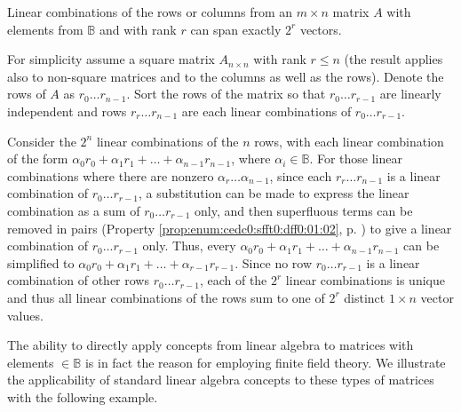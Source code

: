 \begin{vworklemmastatement}
\label{lem:cedc0:sfft0:rmc0:01}
Linear combinations of the
rows or columns from an
$m \times n$ matrix $A$ with elements from $\mathbb{B}$ and with
rank $r$ can span exactly $2^r$ vectors.
\end{vworklemmastatement}
\begin{vworklemmaproof}
For simplicity assume a square matrix $A_{n \times n}$ with rank
$r \leq n$ (the result applies also to non-square matrices and to
the columns as well as the rows).
Denote the rows of $A$ as $r_0 \ldots r_{n-1}$.
Sort the rows of the matrix so that $r_0 \ldots{} r_{r-1}$ are linearly
independent and rows $r_{r} \ldots{} r_{n-1}$ are each linear combinations
of $r_0 \ldots{} r_{r-1}$.

Consider the $2^n$ linear combinations of the 
$n$ rows, with each linear combination of the 
form $\alpha_0 r_0 + \alpha_1 r_1 + \ldots{} + \alpha_{n-1} r_{n-1}$,
where $\alpha_i \in \mathbb{B}$.  For those linear combinations
where there are nonzero $\alpha_{r} \ldots{} \alpha_{n-1}$, since 
each $r_{r} \ldots{} r_{n-1}$ is a linear combination of 
$r_0 \ldots{} r_{r-1}$, a substitution can be made to express the 
linear combination as a sum of $r_0 \ldots{} r_{r-1}$ only, and then 
superfluous terms can be removed in pairs
(Property \ref{prop:enum:cedc0:sfft0:dff0:01:02}, p. \pageref{prop:enum:cedc0:sfft0:dff0:01:02})
to give a linear combination of $r_0 \ldots{} r_{r-1}$ only.
Thus, every $\alpha_0 r_0 + \alpha_1 r_1 + \ldots{} + \alpha_{n-1} r_{n-1}$
can be simplified to $\alpha_0 r_0 + \alpha_1 r_1 + \ldots{} + \alpha_{r-1} r_{r-1}$.
Since no row $r_0 \ldots r_{r-1}$ is a linear combination of other rows
$r_0 \ldots r_{r-1}$, each of the $2^r$ linear combinations 
is unique and thus all linear combinations of the rows
sum to one of $2^r$ distinct $1 \times n$ vector values.
\end{vworklemmaproof}
\vworklemmafooter{}

The ability to directly apply concepts from linear algebra to matrices
with elements $\in \mathbb{B}$ is in fact the reason for employing finite field
theory.  We illustrate the applicability of standard linear algebra concepts to these
types of matrices with the following example.

